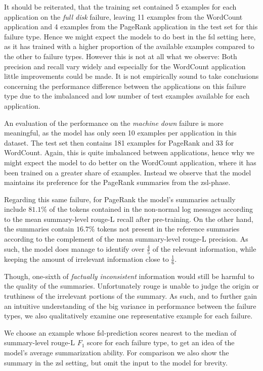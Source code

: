 It should be reiterated,
that the training set contained 5 examples for each application on the \emph{full disk} failure,
leaving 11 examples from the WordCount application
and 4 examples from the PageRank application in the test set for this failure type.
Hence we might expect the models to do best in the \ac{fsl} setting here,
as it has trained with a higher proportion of the available examples compared to the other to failure types.
However this is not at all what we observe:
Both precision and recall vary widely and especially for the WordCount application little improvements could be made.
It is not empirically sound to take conclusions concerning the performance difference between the applications on this failure type
due to the imbalanced and low number of test examples available for each application.

An evaluation of the performance on the \emph{machine down} failure is more meaningful,
as the model has only seen 10 examples per application in this dataset.
The test set then contains 181 examples for PageRank and 33 for WordCount.
Again, this is quite imbalanced between applications,
hence why we might expect the model to do better on the WordCount application,
where it has been trained on a greater share of examples.
Instead we observe that the model maintains its preference for the PageRank summaries from the \ac{zsl}-phase.

Regarding this same failure,
for PageRank the model's summaries actually include \(81.1\%\) of the tokens contained in the non-normal log messages
according to the mean summary-level \acs*{rouge}-L recall after pre-training.
On the other hand, the summaries contain \(16.7\%\) tokens not present in the reference summaries
according to the complement of the mean summary-level \acs*{rouge}-L precision.
As such, the model does manage to identify over \(\frac{4}{5}\) of the relevant information,
while keeping the amount of irrelevant information close to \(\frac{1}{6}\).

Though, one-sixth of \emph{factually inconsistent} information
would still be harmful to the quality of the summaries.
Unfortunately \acs*{rouge} is unable to judge the origin or truthiness of the irrelevant portions of the summary.
As such, and to further gain an intuitive understanding of the big variance in performance between the failure types,
we also qualitatively examine one representative example for each failure.

We choose an example whose \ac{fsl}-prediction scores nearest to the median of
summary-level \acs*{rouge}-L \(F_1\) score for each failure type,
to get an idea of the model's average summarization ability.
For comparison we also show the summary in the \ac{zsl} setting,
but omit the input to the model for brevity.

